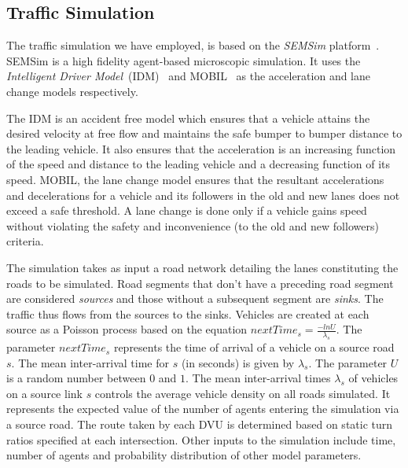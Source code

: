 \documentclass[procedia]{easychair}
\begin{document}
\subsection{Traffic Simulation}
\label{sec:probabilistic}

The traffic simulation we have employed, is based on the {\it SEMSim} platform~\cite{zehe2015semsim}. SEMSim is a high fidelity agent-based microscopic simulation. It uses the {\it Intelligent Driver Model}~(IDM)~\cite{treiber2010open} and MOBIL~\cite{kesting2015general} as the acceleration and lane change models respectively. 

The IDM is an accident free model which ensures that a vehicle attains the desired velocity at free flow and maintains the safe bumper to bumper distance to the leading vehicle. It also ensures that the acceleration is an increasing function of the speed and distance to the leading vehicle and a decreasing function of its speed. MOBIL, the lane change model ensures that the resultant accelerations and decelerations for a vehicle and its followers in the old and new lanes does not exceed a safe threshold. A lane change is done only if a vehicle gains speed without violating the safety and inconvenience (to the old and new followers) criteria.


The simulation takes as input a road network detailing the lanes constituting the roads to be simulated. Road segments that don't have a preceding road segment are considered {\it sources} and those without a subsequent segment are {\it sinks}. The traffic thus flows from the sources to the sinks. Vehicles are created at each source as a Poisson process based on the equation $nextTime_{s}= \frac{-ln U}{\lambda_{s}}$. The parameter $nextTime_{s}$ represents the time of arrival of a vehicle on a source road $s$.  The mean inter-arrival time for $s$ (in seconds) is given by $\lambda_{s}$. The parameter $U$ is a random number between $0$ and $1$. The mean inter-arrival times $\lambda_{s}$ of vehicles on a source link $s$ controls the average vehicle density on all roads simulated. It represents the expected value of the number of agents entering the simulation via a source road. The route taken by each DVU is determined  based on static turn ratios specified at each intersection. Other inputs to the simulation include time, number of agents and probability distribution of other model parameters.
\end{document}
